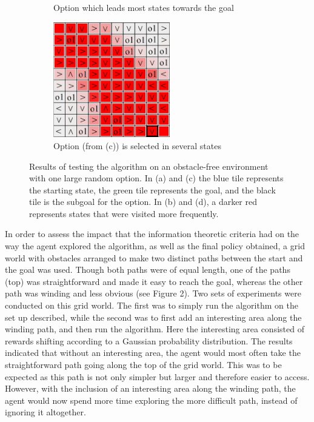 \documentclass{acm_proc_article-sp}
\begin{document}
\begin{figure}[!htbp]
\begin{subfigure}[h]{.5\textwidth}
    \caption{Option which leads most states towards the goal}
  \end{subfigure}
  \hfill
  \begin{subfigure}[h]{.5\textwidth}
  \centering
    \includegraphics[width=2in]{GiantOp2Pol.png}
    \caption{Option (from (c)) is selected in several states}
  \end{subfigure}
  \caption{Results of testing the algorithm on an obstacle-free environment with one large random option. In (a) and (c) the blue tile represents the starting state, the green tile represents the goal, and the black tile is the subgoal for the option. In (b) and (d), a darker red represents states that were visited more frequently.}
  \vspace{20pt}
\end{figure}

In order to assess the impact that the information theoretic criteria had on the way the agent explored the algorithm, as well as the final policy obtained, a grid world with obstacles arranged to make two distinct paths between the start and the goal was used. Though both paths were of equal length, one of the paths (top) was straightforward and made it easy to reach the goal, whereas the other path was winding and less obvious (see Figure 2). 
	Two sets of experiments were conducted on this grid world. The first was to simply run the algorithm on the set up described, while the second was to first add an interesting area along the winding path, and then run the algorithm. Here the interesting area consisted of rewards shifting according to a Gaussian probability distribution. 
	The results indicated that without an interesting area, the agent would most often take the straightforward path going along the top of the grid world. This was to be expected as this path is not only simpler but larger and therefore easier to access. However, with the inclusion of an interesting area along the winding path, the agent would now spend more time exploring the more difficult path, instead of ignoring it altogether.
\end{document}
